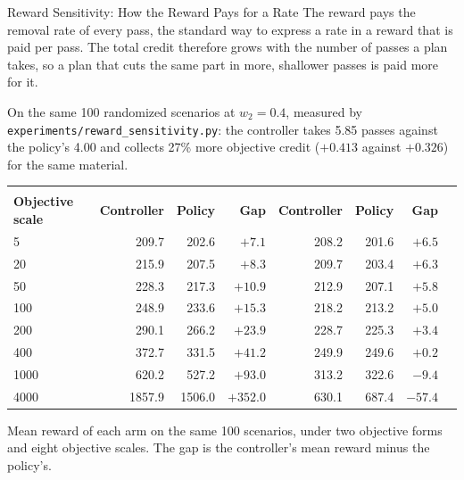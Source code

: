 ﻿\documentclass[11pt,aspectratio=169]{beamer}
\begin{document}
\begin{frame}{Reward Sensitivity: How the Reward Pays for a Rate}
    \small
    The reward pays the removal rate of every pass, the standard way to express a rate in a reward
    that is paid per pass. The total credit therefore grows with the number of passes a plan takes,
    so a plan that cuts the same part in more, shallower passes is paid more for it.

    \vspace{0.1em}
    On the same 100 randomized scenarios at $w_2 = 0.4$, measured by
    \texttt{experiments/reward\_sensitivity.py}: the controller takes \alert{5.85 passes} against the
    policy's \alert{4.00} and collects \alert{27\% more objective credit} ($+0.413$ against $+0.326$)
    for the same material.

    \vspace{0.1em}
    \centering
    \scriptsize
    \renewcommand{\arraystretch}{0.9}
    \begin{tabular}{@{}lrrrrrrr@{}}
    \toprule
    &  &  \\
    \cmidrule(lr){2-4}\cmidrule(lr){5-7}
    \textbf{Objective scale} & \textbf{Controller} & \textbf{Policy} & \textbf{Gap} & \textbf{Controller} & \textbf{Policy} & \textbf{Gap} \\
        & 209.7 & 202.6 & $+7.1$  & 208.2 & 201.6 & $+6.5$ \\
    20   & 215.9 & 207.5 & $+8.3$  & 209.7 & 203.4 & $+6.3$ \\
    50   & 228.3 & 217.3 & $+10.9$ & 212.9 & 207.1 & $+5.8$ \\
    100  & \alert{248.9} & 233.6 & $+15.3$ & 218.2 & 213.2 & $+5.0$ \\
    200  & 290.1 & 266.2 & $+23.9$ & 228.7 & 225.3 & $+3.4$ \\
    400  & 372.7 & 331.5 & $+41.2$ & 249.9 & 249.6 & $+0.2$ \\
    1000 & 620.2 & 527.2 & $+93.0$ & 313.2 & 322.6 & $-9.4$ \\
    4000 & 1857.9 & 1506.0 & $+352.0$ & 630.1 & 687.4 & $-57.4$ \\
    \bottomrule
    \end{tabular}

    \vspace{0.2em}
    {\footnotesize
    Mean reward of each arm on the same 100 scenarios, under two objective forms and eight objective
    scales. The gap is the controller's mean reward minus the policy's.}
\end{frame}
\end{document}
